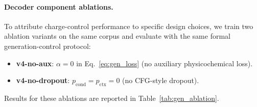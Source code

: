 \paragraph{Decoder component ablations.}
To attribute charge-control performance to specific design choices, we train
two ablation variants on the same corpus and evaluate with the same
formal generation-control protocol:
\begin{itemize}[noitemsep]
  \item \textbf{v4-no-aux}: $\alpha=0$ in Eq.~\ref{eq:gen_loss}
        (no auxiliary physicochemical loss).
  \item \textbf{v4-no-dropout}: $p_\text{cond}=p_\text{ctx}=0$
        (no CFG-style dropout).
\end{itemize}
Results for these ablations are reported in Table~\ref{tab:gen_ablation}.
